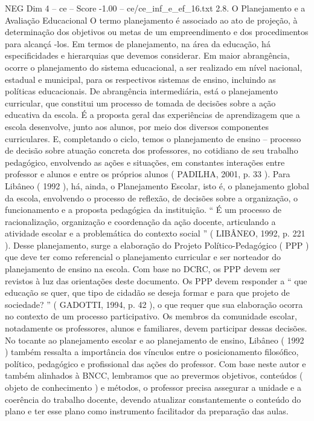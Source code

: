 \begin{textsample}{NEG Dim 4 – ce – Score -1.00 – ce/ce\_inf\_e\_ef\_16.txt}  \label{ex:f4_neg_160}
2.8.
O Planejamento e a Avaliação Educacional O termo planejamento é associado ao ato de projeção, à determinação dos objetivos ou metas de um empreendimento e dos procedimentos para alcançá -los.
Em termos de planejamento, na área da educação, há especificidades e hierarquias que devemos considerar.
Em maior abrangência, ocorre o planejamento do sistema educacional, a ser realizado em nível nacional, estadual e municipal, para os respectivos sistemas de ensino, incluindo as políticas educacionais.
De abrangência intermediária, está o planejamento curricular, que constitui um processo de tomada de decisões sobre a ação educativa da escola.
É a proposta geral das experiências de aprendizagem que a escola desenvolve, junto aos alunos, por meio dos diversos componentes curriculares.
E, completando o ciclo, temos o planejamento de ensino – processo de decisão sobre atuação concreta dos professores, no cotidiano de seu trabalho pedagógico, envolvendo as ações e situações, em constantes interações entre professor e alunos e entre os próprios alunos ( PADILHA, 2001, p. 33 ).
Para Libâneo ( 1992 ), há, ainda, o Planejamento Escolar, isto é, o planejamento global da escola, envolvendo o processo de reflexão, de decisões sobre a organização, o funcionamento e a proposta pedagógica da instituição. “ É um processo de racionalização, organização e coordenação da ação docente, articulando a atividade escolar e a problemática do contexto social ” ( LIBÂNEO, 1992, p. 221 ).
Desse planejamento, surge a elaboração do Projeto Político-Pedagógico ( PPP ) que deve ter como referencial o planejamento curricular e ser norteador do planejamento de ensino na escola.
Com base no DCRC, os PPP devem ser revistos à luz das orientações deste documento.
Os PPP devem responder a “ que educação se quer, que tipo de cidadão se deseja formar e para que projeto de sociedade? ” ( GADOTTI, 1994, p. 42 ), o que requer que sua elaboração ocorra no contexto de um processo participativo.
Os membros da comunidade escolar, notadamente os professores, alunos e familiares, devem participar dessas decisões.
No tocante ao planejamento escolar e ao planejamento de ensino, Libâneo ( 1992 ) também ressalta a importância dos vínculos entre o posicionamento filosófico, político, pedagógico e profissional das ações do professor.
Com base neste autor e também alinhados à BNCC, lembramos que ao prevermos objetivos, conteúdos ( objeto de conhecimento ) e métodos, o professor precisa assegurar a unidade e a coerência do trabalho docente, devendo atualizar constantemente o conteúdo do plano e ter esse plano como instrumento facilitador da preparação das aulas.

\end{textsample}
